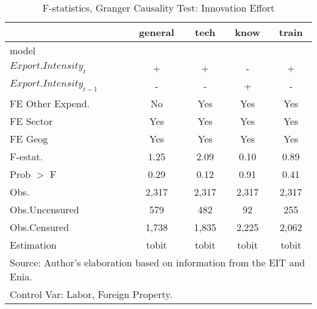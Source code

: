 \begin{table}[htbp]\centering
\def\sym#1{\ifmmode^{#1}\else\(^{#1}\)\fi}
\caption{F-statistics, Granger Causality Test: Innovation Effort}
\begin{tabular}{l*{4}{c}}
\hline\hline
                    &     general&        tech&        know&       train\\
\hline
model               &            &            &            &            \\
$Export.Intensity_{t}$&           +&           +&           -&           +\\
$Export.Intensity_{t-1}$&           -&           -&           +&           -\\
FE Other Expend.    &          No&         Yes&         Yes&         Yes\\
FE Sector           &         Yes&         Yes&         Yes&         Yes\\
FE Geog             &         Yes&         Yes&         Yes&         Yes\\
\hline
F-estat.            &        1.25&        2.09&        0.10&        0.89\\
Prob $>$ F          &        0.29&        0.12&        0.91&        0.41\\
Obs.                &       2,317&       2,317&       2,317&       2,317\\
Obs.Uncensured      &         579&         482&          92&         255\\
Obs.Censured        &       1,738&       1,835&       2,225&       2,062\\
Estimation          &       tobit&       tobit&       tobit&       tobit\\
\hline\hline
\multicolumn{5}{l}{\footnotesize Source: Author's elaboration based on information from the EIT and Enia.}\\
\multicolumn{5}{l}{\footnotesize Control Var: Labor, Foreign Property.}\\
\end{tabular}
\end{table}
